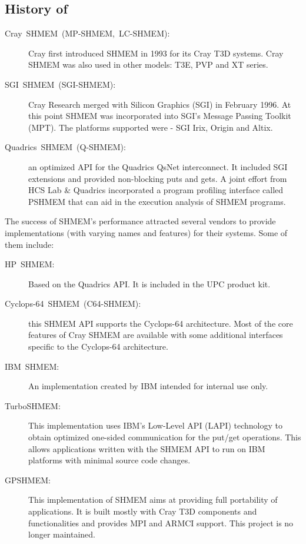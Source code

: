 \subsection{History of \openshmem}
\begin{description}
\item [{{Cray~SHMEM~(MP-SHMEM,~LC-SHMEM):}}] Cray first introduced
SHMEM in 1993 for its Cray T3D systems. Cray SHMEM was also used in
other models: T3E, PVP and XT series. 
\item [{{SGI~SHMEM~(SGI-SHMEM):}}] Cray Research merged with Silicon
Graphics (SGI) in February 1996. At this point SHMEM was incorporated
into SGI's Message Passing Toolkit (MPT). The platforms supported
were - SGI Irix, Origin and Altix. 
\item [{{Quadrics~SHMEM~(Q-SHMEM):}}] an optimized API for the Quadrics
QsNet interconnect. It included SGI extensions and provided non-blocking
puts and gets. A joint effort from HCS Lab \& Quadrics incorporated
a program profiling interface called PSHMEM that can aid in the execution
analysis of SHMEM programs. 
\end{description}
The success of SHMEM's performance attracted several vendors to provide
implementations (with varying names and features) for their systems.
Some of them include: 
\begin{description}
\item [{{HP~SHMEM:}}] Based on the Quadrics API. It is included in the
UPC product kit. 
\item [{{Cyclops-64~SHMEM~(C64-SHMEM):}}] this SHMEM API supports the
Cyclops-64 architecture. Most of the core features of Cray SHMEM are
available with some additional interfaces specific to the Cyclops-64
architecture. %

\item [{{IBM~SHMEM:}}] An implementation created by IBM intended for
internal use only. 
\item [{{TurboSHMEM:}}] This implementation uses IBM's Low-Level \ac{API}
(LAPI) technology to obtain optimized one-sided communication for
the put/get operations. This allows applications written with the
SHMEM API to run on IBM platforms with minimal source code changes. 
\item [{{GPSHMEM:}}] This implementation of SHMEM aims at providing full
portability of applications. It is built mostly with Cray T3D components
and functionalities and provides MPI and ARMCI support. This project
is no longer maintained. \end{description}
